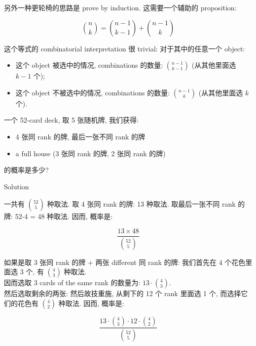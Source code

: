 另外一种更轮椅的思路是 prove by induction. 这需要一个辅助的 proposition:

\begin{proposition}

\[\binom{\mathit{n}}{\mathit{k}} = \binom{\mathit{n} - 1}{\mathit{k} - 1} + \binom{\mathit{n} - 1}{\mathit{k}}\]

\end{proposition}

这个等式的 combinatorial interpretation 很 trivial: 对于其中的任意一个 object:

\begin{itemize}
\item
  这个 object 被选中的情况, combinations 的数量: \(\binom{\mathit{n} - 1}{\mathit{k} - 1}\) (从其他里面选 \(\mathit{k} - 1\) 个);
\item
  这个 object 不被选中的情况, combinations 的数量: \(\binom{\mathit{n} - 1}{\mathit{k}}\) (从其他里面选 \(\mathit{k}\) 个).
\end{itemize}

\begin{example}

一个 52-card deck, 取 5 张随机牌, 我们获得:

\begin{itemize}
\item
  4 张同 rank 的牌, 最后一张不同 rank 的牌
\item
  a full house (3 张同 rank 的牌, 2 张同 rank 的牌)
\end{itemize}

的概率是多少?

\end{example}

\begin{qlsolution}{Solution}

一共有 \(\binom{52}{5}\) 种取法. 取 4 张同 rank 的牌: 13 种取法. 取最后一张不同 rank 的牌: 52-4 = 48 种取法. 因而, 概率是:

\[\frac{13 \times 48}{\binom{52}{5}}\]

如果是取 3 张同 rank 的牌 + 两张 different 同 rank 的牌: 我们首先在 4 个花色里面选 3 个, 有 \(\binom{4}{3}\) 种取法.\\
因而选取 3 cards of the same rank 的数量为: \(13 \cdot \binom{4}{3}\).\\
然后选取剩余的两张: 然后故技重施, 从剩下的 12 个 rank 里面选 1 个, 而选择它们的花色有 \(\binom{4}{2}\) 种取法. 因而, 概率是:

\[\frac{13 \cdot \binom{4}{3} \cdot 12 \cdot \binom{4}{2}}{\binom{52}{5}}\]

\end{qlsolution}

